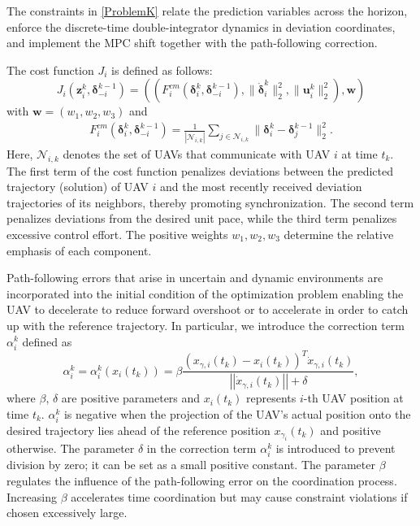 \documentclass[letterpaper,journal]{IEEEtran}
\begin{document}
The  constraints in \eqref{ProblemK} relate the prediction variables across the horizon, enforce the discrete-time double-integrator dynamics in deviation coordinates, and implement the MPC shift together with the path-following correction.

The cost function $J_i$ is defined as follows:
\begin{equation}\label{cost1}
	J_i\left(\mathbf{z}^{k}_{i},\bm{\delta}^{k-1}_{-i}\right)=((F_i^{cm}\left(\bm{\delta}^{k}_{i},\bm{\delta}^{k-1}_{-i}\right),\|\dot{\bm{\delta}}^k_i\|_2^2,
	\|\bm{u}_i^k\|_2^2),\bm{w})
\end{equation}
with $\bm{w}=(w_1,w_2,w_3)$ and 
\begin{equation}\label{synchron}
	\begin{split}
	F_i^{cm}\left(\bm{\delta}^{k}_{i},\bm{\delta}^{k-1}_{-i}\right)=\frac{1}{\left|\mathcal{N}_{i,k}\right|}\sum_{j\in \mathcal{N}_{i,k}} \|\bm{\delta}_i^k-\bm{\delta}_j^{k-1}\|_2^2.
	\end{split}
\end{equation}
Here, $\mathcal{N}_{i,k}$ denotes the set of UAVs that communicate with UAV $i$ at time $t_{k}$.
The first term of the cost function penalizes deviations between the predicted  trajectory (solution) of UAV $i$ and the most recently received deviation trajectories of its neighbors, thereby promoting synchronization. The second term penalizes deviations from the desired unit pace, while the third term penalizes excessive control effort. The positive weights $w_1, w_2, w_3$  determine the relative emphasis of each component.


Path-following errors that arise in uncertain and dynamic environments
are incorporated into the initial condition of the optimization problem enabling the UAV to decelerate to reduce forward overshoot or to accelerate in order to catch up with the reference trajectory.
In particular, we introduce the correction term $\alpha_i^k$ defined as
\begin{equation}\label{def-a}
	\alpha_{i}^{k} =\alpha_{i}^{k}(x_{i}(t_{k}))= \beta\dfrac{(x_{\gamma,i}(t_{k})-x_{i}(t_{k}))^T\dot{x}_{\gamma,i}(t_{k})}{\left|\left|\dot{x}_{\gamma,i}(t_{k})\right|\right|+\delta},
\end{equation}
where $\beta$, $\delta$ are positive parameters and $x_{i}(t_{k})$ represents $i$-th UAV  position at time $t_{k}$.  $\alpha_{i}^{k}$ is negative when the projection of the UAV's actual position onto the desired trajectory lies ahead of the reference position $x_{\gamma_i}(t_{k})$ and positive otherwise.
The parameter $\delta$ in the correction term $\alpha_{i}^{k}$ is introduced to prevent division by zero; it can be set as a small positive constant. The parameter $\beta$ regulates the influence of the path-following error on the coordination process. Increasing $\beta$ accelerates time coordination but may cause constraint violations if chosen excessively large.
\end{document}

